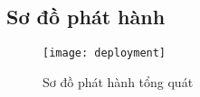 \subsection{Sơ đồ phát hành}
\begin{figure}[h!]\fontsize{13px}{13px}\selectfont
	\begin{center}	
		\texttt{[image: deployment]}
		\caption{Sơ đồ phát hành tổng quát}
	\end{center}
\end{figure}
